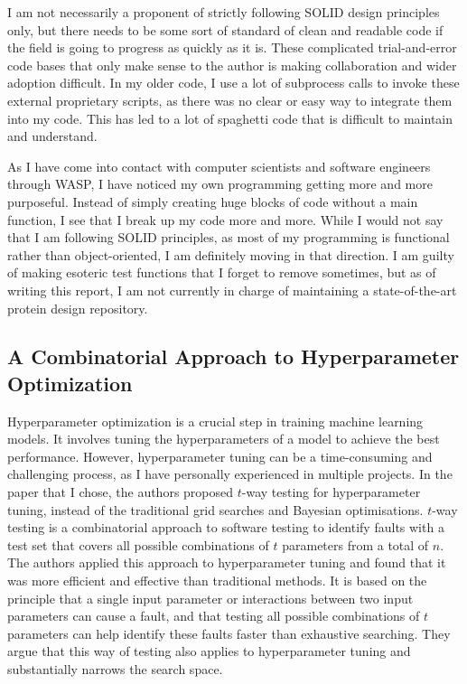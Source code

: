 \documentclass[a4paper, 11pt]{article} %
\begin{document}
I am not necessarily a proponent of strictly following SOLID design principles only, but there needs to be some sort of standard of clean and readable code if the field is going to progress as quickly as it is. These complicated trial-and-error code bases that only make sense to the author is making collaboration and wider adoption difficult. In my older code, I use a lot of subprocess calls to invoke these external proprietary scripts, as there was no clear or easy way to integrate them into my code. This has led to a lot of spaghetti code that is difficult to maintain and understand.

As I have come into contact with computer scientists and software engineers through WASP, I have noticed my own programming getting more and more purposeful. Instead of simply creating huge blocks of code without a main function, I see that I break up my code more and more. While I would not say that I am following SOLID principles, as most of my programming is functional rather than object-oriented, I am definitely moving in that direction. I am guilty of making esoteric test functions that I forget to remove sometimes, but as of writing this report, I am not currently in charge of maintaining a state-of-the-art protein design repository. 

\subsection*{A Combinatorial Approach to Hyperparameter Optimization
\cite{khadkaCombinatorialApproachHyperparameter2024}}

Hyperparameter optimization is a crucial step in training machine learning models. It involves tuning the hyperparameters of a model to achieve the best performance. However, hyperparameter tuning can be a time-consuming and challenging process, as I have personally experienced in multiple projects. In the paper that I chose, the authors proposed $t$-way testing for hyperparameter tuning, instead of the traditional grid searches and Bayesian optimisations. $t$-way testing is a combinatorial approach to software testing to identify faults with a test set that covers all possible combinations of $t$ parameters from a total of $n$. The authors applied this approach to hyperparameter tuning and found that it was more efficient and effective than traditional methods. It is based on the principle that a single input parameter or interactions between two input parameters can cause a fault, and that testing all possible combinations of $t$ parameters can help identify these faults faster than exhaustive searching\cite*{Texas_2007}. They argue that this way of testing also applies to hyperparameter tuning and substantially narrows the search space.
\end{document}
